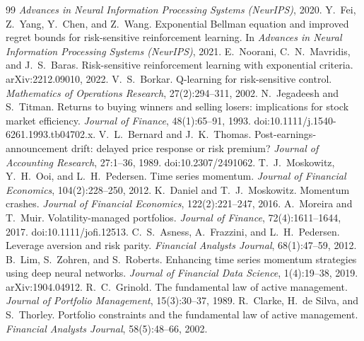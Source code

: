 \documentclass[11pt]{article}
\theoremstyle{definition}
\begin{document}
\begin{thebibliography}{99}
\emph{Advances in Neural Information Processing Systems (NeurIPS)}, 2020.
 Y.~Fei, Z.~Yang, Y.~Chen, and Z.~Wang. Exponential Bellman equation
and improved regret bounds for risk-sensitive reinforcement learning. In
\emph{Advances in Neural Information Processing Systems (NeurIPS)}, 2021.
 E.~Noorani, C.~N.~Mavridis, and J.~S.~Baras. Risk-sensitive
reinforcement learning with exponential criteria. arXiv:2212.09010, 2022.
 V.~S.~Borkar. Q-learning for risk-sensitive control.
\emph{Mathematics of Operations Research}, 27(2):294--311, 2002.
 N.~Jegadeesh and S.~Titman. Returns to buying winners and
selling losers: implications for stock market efficiency. \emph{Journal of Finance},
48(1):65--91, 1993. doi:10.1111/j.1540-6261.1993.tb04702.x.
 V.~L.~Bernard and J.~K.~Thomas. Post-earnings-announcement drift:
delayed price response or risk premium? \emph{Journal of Accounting Research},
27:1--36, 1989. doi:10.2307/2491062.
 T.~J.~Moskowitz, Y.~H.~Ooi, and L.~H.~Pedersen. Time series
momentum. \emph{Journal of Financial Economics}, 104(2):228--250, 2012.
 K.~Daniel and T.~J.~Moskowitz. Momentum crashes. \emph{Journal of
Financial Economics}, 122(2):221--247, 2016.
 A.~Moreira and T.~Muir. Volatility-managed portfolios.
\emph{Journal of Finance}, 72(4):1611--1644, 2017. doi:10.1111/jofi.12513.
 C.~S.~Asness, A.~Frazzini, and L.~H.~Pedersen. Leverage aversion
and risk parity. \emph{Financial Analysts Journal}, 68(1):47--59, 2012.
 B.~Lim, S.~Zohren, and S.~Roberts. Enhancing time series momentum
strategies using deep neural networks. \emph{Journal of Financial Data Science},
1(4):19--38, 2019. arXiv:1904.04912.
 R.~C.~Grinold. The fundamental law of active management.
\emph{Journal of Portfolio Management}, 15(3):30--37, 1989.
 R.~Clarke, H.~de Silva, and S.~Thorley. Portfolio constraints and
the fundamental law of active management. \emph{Financial Analysts Journal},
58(5):48--66, 2002.
\end{thebibliography}
\end{document}
